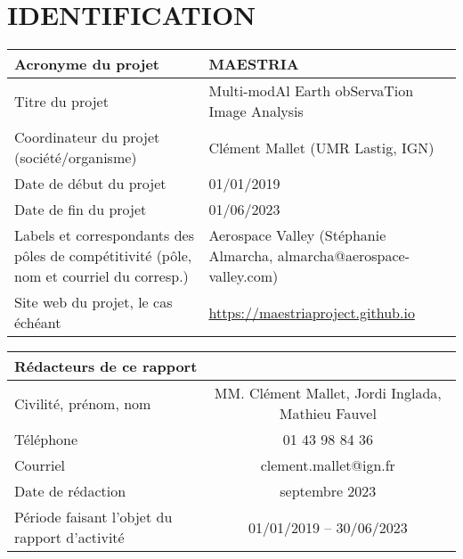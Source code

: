 \section{IDENTIFICATION}
\label{sec:identification}


\begin{table}[htbp]
    \centering
    \begin{tabular}{|p{6.5cm}|p{8.5cm}|}
    \hline
   \cellcolor{gris}\textbf{ Acronyme du projet} &\cellcolor{gris} \textbf{MAESTRIA} \\
        \hline
Titre du projet &
Multi-modAl Earth obServaTion Image Analysis \\
    \hline

Coordinateur du projet (société/organisme)&
Clément Mallet (UMR Lastig, IGN) \\
    \hline

Date de début du projet & 01/01/2019 \\
Date de fin du projet & 01/06/2023 \\
    \hline

Labels et correspondants des pôles de compétitivité 
(pôle, nom et courriel du corresp.) &
Aerospace Valley (Stéphanie Almarcha, almarcha@aerospace-valley.com)\\
    \hline

Site web du projet, le cas échéant &
\href{https://maestriaproject.github.io/maestria.github.io/}{https://maestriaproject.github.io} \\
    \hline

    \end{tabular}
    \label{tab:my_label}
\end{table}
\begin{table}[htbp]
    \centering
    \begin{tabular}{|p{6.5cm}|c|}
        \hline

\multicolumn{2}{|l|}{\cellcolor{gris}\textbf{Rédacteurs de ce rapport}} \\       \hline
Civilité, prénom, nom & 
MM. Clément Mallet, Jordi Inglada, Mathieu Fauvel \\    \hline
Téléphone &
01 43 98 84 36 \\    \hline
Courriel &
clement.mallet@ign.fr \\     \hline
Date de rédaction &
septembre 2023 \\     \hline
Période faisant l’objet du rapport d’activité &
01/01/2019 – 30/06/2023 \\    \hline


    \end{tabular}
    \label{tab:my_label2}
\end{table}